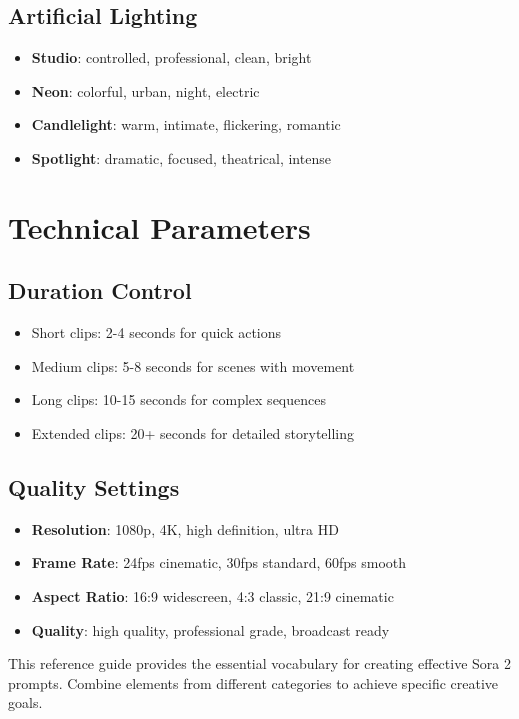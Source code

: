 \subsection{Artificial Lighting}
\begin{itemize}
\item \textbf{Studio}: controlled, professional, clean, bright
\item \textbf{Neon}: colorful, urban, night, electric
\item \textbf{Candlelight}: warm, intimate, flickering, romantic
\item \textbf{Spotlight}: dramatic, focused, theatrical, intense
\end{itemize}

\section{Technical Parameters}

\subsection{Duration Control}
\begin{itemize}
\item Short clips: 2-4 seconds for quick actions
\item Medium clips: 5-8 seconds for scenes with movement
\item Long clips: 10-15 seconds for complex sequences
\item Extended clips: 20+ seconds for detailed storytelling
\end{itemize}

\subsection{Quality Settings}
\begin{itemize}
\item \textbf{Resolution}: 1080p, 4K, high definition, ultra HD
\item \textbf{Frame Rate}: 24fps cinematic, 30fps standard, 60fps smooth
\item \textbf{Aspect Ratio}: 16:9 widescreen, 4:3 classic, 21:9 cinematic
\item \textbf{Quality}: high quality, professional grade, broadcast ready
\end{itemize}

This reference guide provides the essential vocabulary for creating effective Sora 2 prompts. Combine elements from different categories to achieve specific creative goals.